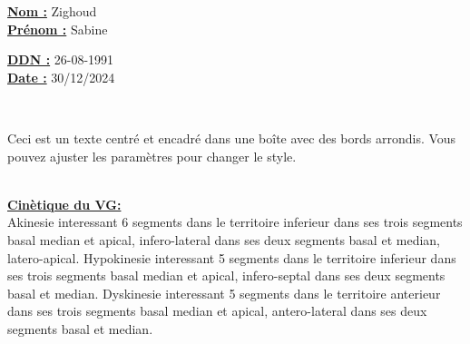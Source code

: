\documentclass[12pt,a4paper]{article}%
\begin{document}
%
\normalsize%
\begin{minipage}{0.5\linewidth}%
\textbf{\underline{Nom :}} \hspace{1cm} Zighoud%
\\%
\textbf{\underline{Prénom :}} \hspace{1cm} Sabine%
\\%
\end{minipage}%
\begin{minipage}{0.5\linewidth}%
\textbf{\underline{DDN :}} \hspace{1cm} 26-08-1991%
\\%
\textbf{\underline{Date :}} \hspace{1cm} 30/12/2024%
\\%
\end{minipage}%
\hspace{\textwidth}%
\\%
\begin{center}%

            \begin{tcolorbox}[
                colframe=blue,        %
                colback=white,        %
                coltitle=black,       %
                arc=8pt,              %
                boxrule=1mm,          %
                width=0.8\textwidth,  %
                auto outer arc,       %
            ]
            Ceci est un texte centré et encadré dans une boîte avec des bords arrondis.
            Vous pouvez ajuster les paramètres pour changer le style.
            \end{tcolorbox}
\end{center}%
\\%
%
\vspace*{\baselineskip}%
\textbf{\ul{Cinètique du VG:}}%
\\%
Akinesie interessant 6 segments dans le territoire inferieur dans ses trois segments basal median et apical, infero{-}lateral dans ses deux segments basal et median, latero{-}apical. Hypokinesie interessant 5 segments dans le territoire inferieur dans ses trois segments basal median et apical, infero{-}septal dans ses deux segments basal et median. Dyskinesie interessant 5 segments dans le territoire anterieur dans ses trois segments basal median et apical, antero{-}lateral dans ses deux segments basal et median.%
\\%
\end{document}
